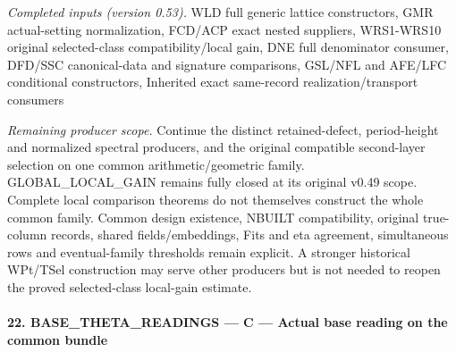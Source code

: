\emph{Completed inputs (version 0.53).} WLD full generic lattice constructors, GMR actual-setting normalization, FCD/ACP exact nested suppliers, WRS1-WRS10 original selected-class compatibility/local gain, DNE full denominator consumer, DFD/SSC canonical-data and signature comparisons, GSL/NFL and AFE/LFC conditional constructors, Inherited exact same-record realization/transport consumers

\emph{Remaining producer scope.} Continue the distinct retained-defect, period-height and normalized spectral producers, and the original compatible second-layer selection on one common arithmetic/geometric family. GLOBAL\_\allowbreak LOCAL\_\allowbreak GAIN remains fully closed at its original v0.49 scope. Complete local comparison theorems do not themselves construct the whole common family. Common design existence, NBUILT compatibility, original true-column records, shared fields/embeddings, Fits and eta agreement, simultaneous rows and eventual-family thresholds remain explicit. A stronger historical WPt/TSel construction may serve other producers but is not needed to reopen the proved selected-class local-gain estimate.



\paragraph{22. BASE\_\allowbreak THETA\_\allowbreak READINGS — C — Actual base reading on the common bundle}

